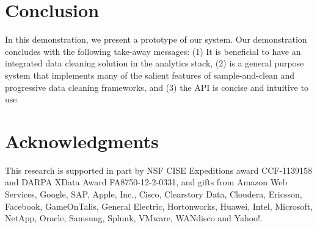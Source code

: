 \section{Conclusion}
In this demonstration, we present a prototype of our \projx system.
Our demonstration concludes with the following take-away messages:
(1) It is beneficial to have an integrated data cleaning solution in the analytics stack,
(2) \projx is a general purpose system that implements many of the salient features of sample-and-clean and progressive data cleaning frameworks, and
(3) the API is concise and intuitive to use.

\section{Acknowledgments}
This research is supported in part by NSF CISE Expeditions award CCF-1139158 and DARPA XData Award FA8750-12-2-0331, and  gifts from Amazon Web Services, Google, SAP,  Apple, Inc., Cisco, Clearstory Data, Cloudera, Ericsson, Facebook, GameOnTalis, General Electric, Hortonworks, Huawei, Intel, Microsoft, NetApp, Oracle, Samsung, Splunk, VMware, WANdisco and Yahoo!.










